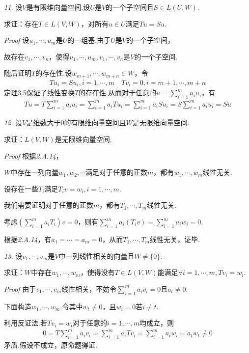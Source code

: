 \textit{11.}
设\(V\)是有限维向量空间.设\(U\)是\(V\)的一个子空间且\(S\in L(U,W)\).

求证：存在\(T\in L(V,W)\)，对所有\(u\in U\)满足\(Tu=Su\).

\textit{Proof}
设\(u_1,\cdots,u_m\)是\(U\)的一组基.由于\(U\)是\(V\)的一个子空间，

故存在\(v_1,\cdots,v_n\)，使得\(u_1,\cdots,u_m,v_1,\cdots,v_n\)是\(V\)的一个子空间.

随后证明\(T\)的存在性.设\(w_{m+1},\cdots,w_{m+n} \in W\)，令
    \begin{align*}
        Tu_i=Su_i,i=1,\cdots,m \quad Tv_i=0,i=m+1,\cdots,m+n
    \end{align*}
定理3.5保证了线性变换\(T\)的存在性.从而对于任意的\(u=\sum_{i=1}^m a_iu_i\)，有
    \begin{align*}
        Tu=T\sum_{i=1}^m a_iu_i=\sum_{i=1}^m a_iTu_i=\sum_{i=1}^m a_iSu_i=S\sum_{i=1}^m a_iu_i=Su
    \end{align*}

\hspace*{\fill}

\textit{12.}
设\(V\)是维数大于0的有限维向量空间且\(W\)是无限维向量空间.

求证：\(L(V,W)\)是无限维向量空间.

\textit{Proof}
根据\textit{2.A.14}，

\(W\)中存在一列向量\(w_1,w_2,\cdots\)满足对于任意的正数\(m\)，都有\(w_1,\cdots,w_m\)线性无关.

设存在一些\(T_i\)满足\(T_iv=w_i,i=1,\cdots,m\).

我们需要证明对于任意的正数\(m\)，都有\(T_1,\cdots,T_m\)线性无关.

考虑\((\sum_{i=1}^m a_iT_i)v=0\)，则有\(\sum_{i=1}^m a_i(T_iv)=\sum_{i=1}^m a_iw_i=0\).

根据\textit{2.A.14}，有\(a_1=\cdots=a_m=0\)，从而\(T_1,\cdots,T_m\)线性无关，证毕.

\hspace*{\fill}

\textit{13.}
设\(v_1,\cdots,v_m\)是\(V\)中一列线性相关的向量且\(W \ne \{0\}\).

求证：\(W\)中存在\(w_1,\cdots,w_m\)，使得没有\(T\in L(V,W)\)能满足\(\forall i=1,\cdots,m,Tv_i=w_i\).

\textit{Proof}
由于\(v_1,\cdots,v_m\)线性相关，不妨令\(\sum_{i=1}^m a_iv_i=0\)且\(a_t \ne 0\).

下面构造\(w_1,\cdots,w_m\).令其中\(w_t \ne 0\)，且\(w_i=0\)若\(i \ne t\).

利用反证法.若\(Tv_i=w_i\)对于任意的\(i=1,\cdots,m\)均成立，则
    \begin{align*}
        0=T\sum_{i=1}^m a_iv_i=\sum_{i=1}^m a_iTv_i=\sum_{i=1}^m a_iw_i=a_tw_t \ne 0
    \end{align*}
矛盾.假设不成立，原命题得证.